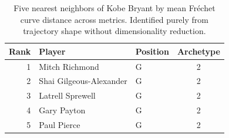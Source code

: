 \begin{table}[htbp]
  \centering\small
  \begin{tabular}{rllc}
    \toprule
    Rank & Player & Position & Archetype \\
    \midrule
    1 & Mitch Richmond & G & 2 \\
    2 & Shai Gilgeous-Alexander & G & 2 \\
    3 & Latrell Sprewell & G & 2 \\
    4 & Gary Payton & G & 2 \\
    5 & Paul Pierce & G & 2 \\
    \bottomrule
  \end{tabular}
  \caption{Five nearest neighbors of Kobe Bryant by mean Fr\'{e}chet curve distance across metrics. Identified purely from trajectory shape without dimensionality reduction.}
  \label{tab:Kobe_Bryant_frechet_curve_neighbors}
\end{table}

